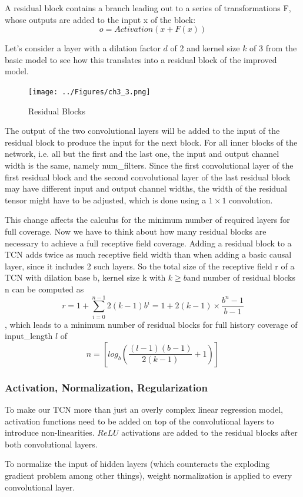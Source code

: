 A residual block contains a branch leading out to a series of transformations F, whose outputs are added to the input x of the block: $$o=Activation(x+F(x))$$

Let’s consider a layer with a dilation factor $d$ of 2 and kernel size $k$ of 3 from the basic model to see how this translates into a residual block of the improved model.
\begin{figure}[H]
    \texttt{[image: ../Figures/ch3\_3.png]}
    \caption{Residual Blocks}
\end{figure}

The output of the two convolutional layers will be added to the input of the residual block to produce the input for the next block. For all inner blocks of the network, i.e. all but the first and the last one, the input and output channel width is the same, namely num\_filters. Since the first convolutional layer of the first residual block and the second convolutional layer of the last residual block may have different input and output channel widths, the width of the residual tensor might have to be adjusted, which is done using a $1\times1$ convolution.

This change affects the calculus for the minimum number of required layers for full coverage. Now we have to think about how many residual blocks are necessary to achieve a full receptive field coverage. Adding a residual block to a TCN adds twice as much receptive field width than when adding a basic causal layer, since it includes 2 such layers. So the total size of the receptive field r of a TCN with dilation base b, kernel size k with $k \geq b $and number of residual blocks n can be computed as $$r = 1 + \sum_{i=0}^{n-1}2(k-1)b^i=1+2(k-1)\times \frac{b^n-1}{b-1}$$, which leads to a minimum number of residual blocks  for full history coverage of input\_length $l$ of $$n=\left[log_b(\frac{(l-1)(b-1)}{2(k-1)}+1)\right]$$

\subsubsection{Activation, Normalization, Regularization}
To make our TCN more than just an overly complex linear regression model, activation functions need to be added on top of the convolutional layers to introduce non-linearities. $ReLU$ activations are added to the residual blocks after both convolutional layers.

To normalize the input of hidden layers (which counteracts the exploding gradient problem among other things), weight normalization is applied to every convolutional layer.

